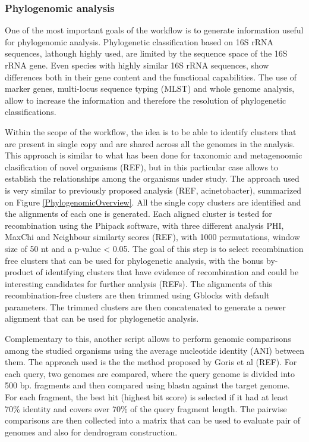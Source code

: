 \subsubsection{Phylogenomic analysis}

One of the most important goals of the workflow is to generate information useful for phylogenomic analysis. Phylogenetic classification based on 16S rRNA sequences, lathough highly used, are limited by the sequence space of the 16S rRNA gene. Even species with highly similar 16S rRNA sequences, show differences both in their gene content and the functional capabilities. The use of marker genes, multi-locus sequence typing (MLST) and whole genome analysis, allow to increase the information and therefore the resolution of phylogenetic classifications. 

Within the scope of the workflow, the idea is to be able to identify clusters that are present in single copy and are shared across all the genomes in the analysis. This approach is similar to what has been done for taxonomic and metagenoomic clasification of novel organisms (REF), but in this particular case allows to establish the relationships among the organisms under study. The approach used is very similar to previously proposed analysis (REF, acinetobacter), summarized on Figure \ref{PhylogenomicOverview}. All the single copy clusters are identified and the alignments of each one is generated. Each aligned cluster is tested for recombination using the Phipack software, with three different analysis PHI, MaxChi and Neighbour similarty scores (REF), with 1000 permutations, window size of 50 nt and a p-value < 0.05. The goal of this step is to select recombination free clusters that can be used for phylogenetic analysis, with the bonus by-product of identifying clusters that have evidence of recombination and could be interesting candidates for further analysis (REFs). The alignments of this recombination-free clusters are then trimmed using Gblocks with default parameters. The trimmed clusters are then concatenated to generate a newer alignment that can be used for phylogenetic analysis.

Complementary to this, another script allows to perform genomic comparisons among the studied organisms using the average nucleotide identity (ANI) between them. The approach used is the the method proposed by Goris et al (REF). For each query, two genomes are compared, where the query genome is divided into 500 bp. fragments and then compared using blastn against the target genome. For each fragment, the best hit (highest bit score) is selected if it had at least 70\% identity and covers over 70\% of the query fragment length. The pairwise comparisons are then collected into a matrix that can be used to evaluate pair of genomes and also for dendrogram construction.

